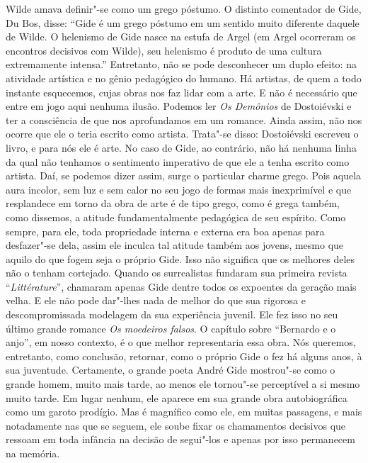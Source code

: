 Wilde amava definir"-se como um grego póstumo. O distinto comentador de
Gide, Du Bos, disse: ``Gide é um grego póstumo em um sentido muito
diferente daquele de Wilde. O helenismo de Gide nasce na estufa de Argel
(em Argel ocorreram os encontros decisivos com Wilde), seu helenismo é
produto de uma cultura extremamente intensa.'' Entretanto, não se pode
desconhecer um duplo efeito: na atividade artística e no gênio pedagógico
do humano. Há artistas, de quem a todo instante esquecemos, cujas
obras nos faz lidar com a arte. E não é necessário que entre em jogo
aqui nenhuma ilusão. Podemos ler \emph{Os Demônios} de Dostoiévski e ter
a consciência de que nos aprofundamos em um romance. Ainda assim, não
nos ocorre que ele o teria escrito como artista. Trata"-se disso:
Dostoiévski escreveu o livro, e para nós ele é arte. No caso de Gide, ao
contrário, não há nenhuma linha da qual não tenhamos o sentimento
imperativo de que ele a tenha escrito como artista. Daí, se podemos dizer
assim, surge o particular charme grego. Pois aquela aura incolor, sem luz e sem
calor no seu jogo de formas mais inexprimível e que resplandece em torno da
obra de arte é de tipo grego, como é grega também, como dissemos, a atitude
fundamentalmente pedagógica de seu espírito. Como sempre, para ele, toda
propriedade interna e externa era boa apenas para desfazer"-se dela,
assim ele inculca tal atitude também aos jovens, mesmo que aquilo do que
fogem seja o próprio Gide. Isso não significa que os melhores deles não o
tenham cortejado. Quando os surrealistas fundaram sua primeira revista
``\emph{Littérature}'', chamaram apenas Gide dentre todos os expoentes
da geração mais velha. E ele não pode dar"-lhes nada de melhor do que sua
rigorosa e descompromissada modelagem da sua experiência juvenil. Ele fez isso
no seu último grande romance \emph{Os moedeiros falsos}. O
capítulo sobre ``Bernardo e o anjo'', em nosso contexto, é o que melhor
representaria essa obra. Nós queremos, entretanto, como conclusão,
retornar, como o próprio Gide o fez há alguns anos, à sua juventude.
Certamente, o grande poeta André Gide mostrou"-se como o grande homem,
muito mais tarde, ao menos ele tornou"-se perceptível a si mesmo muito
tarde. Em lugar nenhum, ele aparece em sua grande obra autobiográfica
como um garoto prodígio. Mas é magnífico como ele, em muitas passagens,
e mais notadamente nas que se seguem, ele soube fixar os chamamentos
decisivos que ressoam em toda infância na decisão de segui"-los e
apenas por isso permanecem na memória.


